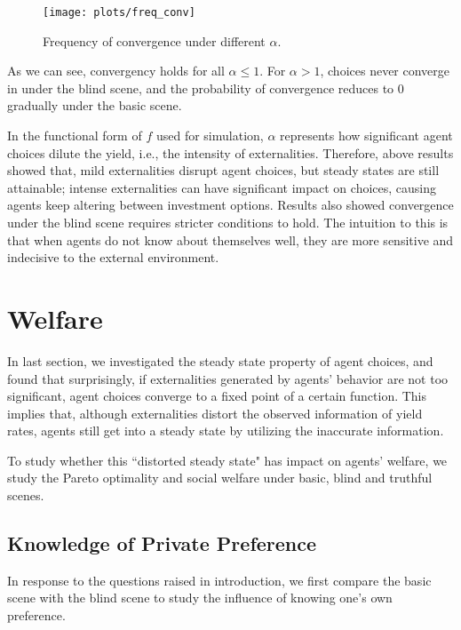 \documentclass[12pt,english]{article}
\theoremstyle{plain}
\theoremstyle{plain}
\begin{document}
	\begin{figure}[h]
	\centering
	\texttt{[image: plots/freq\_conv]}
	\caption{Frequency of convergence under different $\alpha$.}
	\label{fig:freq_conv}
	\end{figure}

	As we can see, convergency holds for all $\alpha \leqslant 1$. For $\alpha > 1$, choices never converge in under the blind scene, and the probability of convergence reduces to 0 gradually under the basic scene.\par
	
	In the functional form of $f$ used for simulation, $\alpha$ represents how significant agent choices dilute the yield, i.e., the intensity of externalities. Therefore, above results showed that, mild externalities disrupt agent choices, but steady states are still attainable; intense externalities can have significant impact on choices, causing agents keep altering between investment options. Results also showed convergence under the blind scene requires stricter conditions to hold. The intuition to this is that when agents do not know about themselves well, they are more sensitive and indecisive to the external environment.
	
	\section{Welfare}
	In last section, we investigated the steady state property of agent choices, and found that surprisingly, if externalities generated by agents' behavior are not too significant, agent choices converge to a fixed point of a certain function. This implies that, although externalities distort the observed information of yield rates, agents still get into a steady state by utilizing the inaccurate information.\par 
	
	To study whether this ``distorted steady state" has impact on agents' welfare, we study the Pareto optimality and social welfare under basic, blind and truthful scenes. 
	
	\subsection{Knowledge of Private Preference}
	In response to the questions raised in introduction, we first compare the basic scene with the blind scene to study the influence of knowing one's own preference. \par
	
\end{document}
